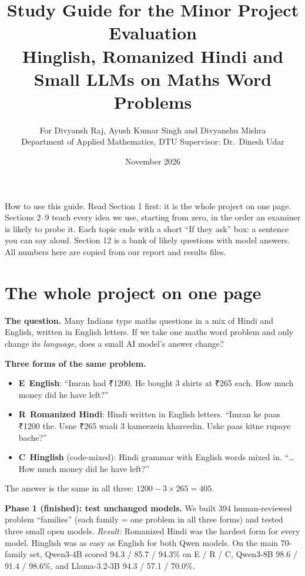 \documentclass[11pt,a4paper]{article}
\title{\sffamily\bfseries Study Guide for the Minor Project Evaluation\\[4pt]\large Hinglish, Romanized Hindi and Small LLMs on Maths Word Problems}
\author{For Divyansh Raj, Ayush Kumar Singh and Divyanshu Mishra\\ \small Department of Applied Mathematics, DTU \quad Supervisor: Dr.\ Dinesh Udar}
\date{November 2026}
\newcommand{\rs}{{\devafont ₹}}
\newcommand{\Ef}{\textcolor{E}{\textbf{E}}}
\newcommand{\Rf}{\textcolor{R}{\textbf{R}}}
\newcommand{\Cf}{\textcolor{C}{\textbf{C}}}
\begin{document}
\maketitle

\begin{oneline}
How to use this guide. Read Section 1 first: it is the whole project on one page. Sections 2--9 teach every idea we use, starting from zero, in the order an examiner is likely to probe it. Each topic ends with a short ``If they ask'' box: a sentence you can say aloud. Section 12 is a bank of likely questions with model answers. All numbers here are copied from our report and results files.
\end{oneline}

\tableofcontents
\newpage

\section{The whole project on one page}

\textbf{The question.} Many Indians type maths questions in a mix of Hindi and English, written in English letters. If we take one maths word problem and only change its \emph{language}, does a small AI model's answer change?

\textbf{Three forms of the same problem.}
\begin{itemize}
\item \Ef\ \textbf{English}: ``Imran had \rs{}1200. He bought 3 shirts at \rs{}265 each. How much money did he have left?''
\item \Rf\ \textbf{Romanized Hindi}: Hindi written in English letters. ``Imran ke paas \rs{}1200 the. Usne \rs{}265 waali 3 kameezein khareedin. Uske paas kitne rupaye bache?''
\item \Cf\ \textbf{Hinglish} (code-mixed): Hindi grammar with English words mixed in. ``\ldots How much money did he have left?''
\end{itemize}
The answer is the same in all three: $1200 - 3\times 265 = 405$.

\textbf{Phase 1 (finished): test unchanged models.} We built 394 human-reviewed problem ``families'' (each family = one problem in all three forms) and tested three small open models. \emph{Result:} Romanized Hindi was the hardest form for every model. Hinglish was as easy as English for both Qwen models. On the main 70-family set, Qwen3-4B scored 94.3 / 85.7 / 94.3\% on E / R / C, Qwen3-8B 98.6 / 91.4 / 98.6\%, and Llama-3.2-3B 94.3 / 57.1 / 70.0\%.
\end{document}
